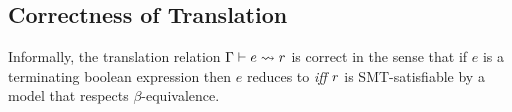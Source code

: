 
\subsection{Correctness of Translation}

Informally, the translation relation $ \Gamma\vdash e \rightsquigarrow r $
is correct in the sense that if $e$ is a terminating boolean expression
then $e$ reduces to \etrue \textit{iff} $r$ is SMT-satisfiable
by a model that respects $\beta$-equivalence.

